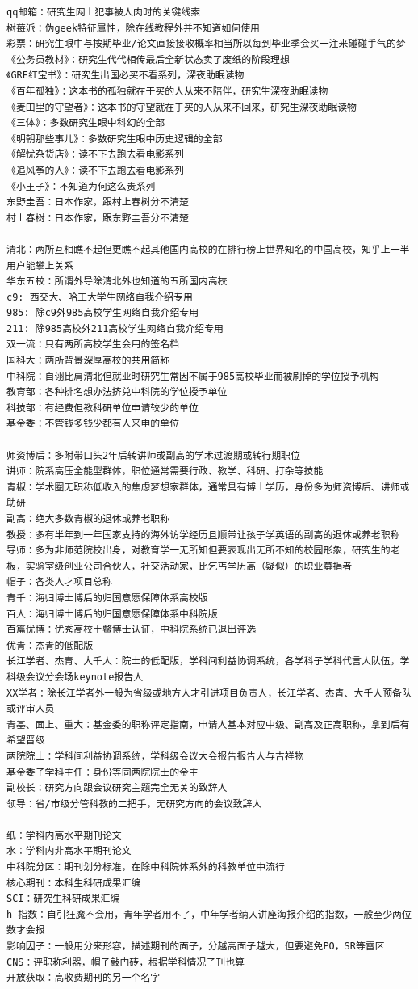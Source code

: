 \documentclass[
]{book}
\begin{document}
\begin{verbatim}
qq邮箱：研究生网上犯事被人肉时的关键线索
树莓派：伪geek特征属性，除在线教程外并不知道如何使用
彩票：研究生眼中与按期毕业/论文直接接收概率相当所以每到毕业季会买一注来碰碰手气的梦
《公务员教材》：研究生代代相传最后全新状态卖了废纸的阶段理想
《GRE红宝书》：研究生出国必买不看系列，深夜助眠读物
《百年孤独》：这本书的孤独就在于买的人从来不陪伴，研究生深夜助眠读物
《麦田里的守望者》：这本书的守望就在于买的人从来不回来，研究生深夜助眠读物
《三体》：多数研究生眼中科幻的全部
《明朝那些事儿》：多数研究生眼中历史逻辑的全部
《解忧杂货店》：读不下去跑去看电影系列
《追风筝的人》：读不下去跑去看电影系列
《小王子》：不知道为何这么贵系列
东野圭吾：日本作家，跟村上春树分不清楚
村上春树：日本作家，跟东野圭吾分不清楚

清北：两所互相瞧不起但更瞧不起其他国内高校的在排行榜上世界知名的中国高校，知乎上一半用户能攀上关系
华东五校：所谓外导除清北外也知道的五所国内高校
c9: 西交大、哈工大学生网络自我介绍专用
985: 除c9外985高校学生网络自我介绍专用
211: 除985高校外211高校学生网络自我介绍专用
双一流：只有两所高校学生会用的签名档
国科大：两所背景深厚高校的共用简称
中科院：自诩比肩清北但就业时研究生常因不属于985高校毕业而被刷掉的学位授予机构
教育部：各种排名想办法挤兑中科院的学位授予单位
科技部：有经费但教科研单位申请较少的单位
基金委：不管钱多钱少都有人来申的单位

师资博后：多附带口头2年后转讲师或副高的学术过渡期或转行期职位
讲师：院系高压全能型群体，职位通常需要行政、教学、科研、打杂等技能
青椒：学术圈无职称低收入的焦虑梦想家群体，通常具有博士学历，身份多为师资博后、讲师或助研
副高：绝大多数青椒的退休或养老职称
教授：多有半年到一年国家支持的海外访学经历且顺带让孩子学英语的副高的退休或养老职称
导师：多为非师范院校出身，对教育学一无所知但要表现出无所不知的校园形象，研究生的老板，实验室级创业公司合伙人，社交活动家，比乞丐学历高（疑似）的职业募捐者
帽子：各类人才项目总称
青千：海归博士博后的归国意愿保障体系高校版
百人：海归博士博后的归国意愿保障体系中科院版
百篇优博：优秀高校土鳖博士认证，中科院系统已退出评选
优青：杰青的低配版
长江学者、杰青、大千人：院士的低配版，学科间利益协调系统，各学科子学科代言人队伍，学科级会议分会场keynote报告人
XX学者：除长江学者外一般为省级或地方人才引进项目负责人，长江学者、杰青、大千人预备队或评审人员
青基、面上、重大：基金委的职称评定指南，申请人基本对应中级、副高及正高职称，拿到后有希望晋级
两院院士：学科间利益协调系统，学科级会议大会报告报告人与吉祥物
基金委子学科主任：身份等同两院院士的金主
副校长：研究方向跟会议研究主题完全无关的致辞人
领导：省/市级分管科教的二把手，无研究方向的会议致辞人

纸：学科内高水平期刊论文
水：学科内非高水平期刊论文
中科院分区：期刊划分标准，在除中科院体系外的科教单位中流行
核心期刊：本科生科研成果汇编
SCI：研究生科研成果汇编
h-指数：自引狂魔不会用，青年学者用不了，中年学者纳入讲座海报介绍的指数，一般至少两位数才会报
影响因子：一般用分来形容，描述期刊的面子，分越高面子越大，但要避免PO，SR等雷区
CNS：评职称利器，帽子敲门砖，根据学科情况子刊也算
开放获取：高收费期刊的另一个名字
\end{verbatim}
\end{document}
